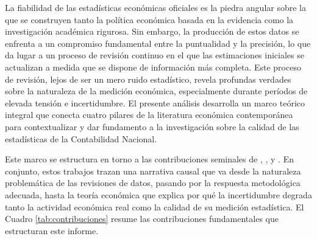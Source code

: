 \documentclass{article}
\begin{document}
La fiabilidad de las estadísticas económicas oficiales es la piedra angular sobre la que se construyen tanto la política económica basada en la evidencia como la investigación académica rigurosa. Sin embargo, la producción de estos datos se enfrenta a un compromiso fundamental entre la puntualidad y la precisión, lo que da lugar a un proceso de revisión continuo en el que las estimaciones iniciales se actualizan a medida que se dispone de información más completa. Este proceso de revisión, lejos de ser un mero ruido estadístico, revela profundas verdades sobre la naturaleza de la medición económica, especialmente durante períodos de elevada tensión e incertidumbre. El presente análisis desarrolla un marco teórico integral que conecta cuatro pilares de la literatura económica contemporánea para contextualizar y dar fundamento a la investigación sobre la calidad de las estadísticas de la Contabilidad Nacional.

Este marco se estructura en torno a las contribuciones seminales de \citet{aruoba2008}, \citet{croushore2011}, \citet{bloom2009} y \citet{baker2016}. En conjunto, estos trabajos trazan una narrativa causal que va desde la naturaleza problemática de las revisiones de datos, pasando por la respuesta metodológica adecuada, hasta la teoría económica que explica por qué la incertidumbre degrada tanto la actividad económica real como la calidad de su medición estadística. El Cuadro \ref{tab:contribuciones} resume las contribuciones fundamentales que estructuran este informe.
\end{document}
